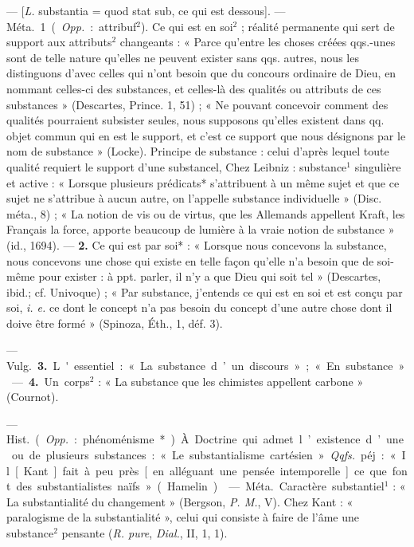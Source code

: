 \begin{itemize}[leftmargin=1cm, label=, itemsep=1pt]
 — [{\it L.} substantia = quod stat
sub, ce qui est dessous]. — \si{Méta.}
1. ({\it Opp.} : attribuf$^2$). Ce qui est en
soi$^2$ ; réalité permanente qui sert de
support aux attributs$^2$ changeants :
« Parce qu’entre les choses créées
qqs.-unes sont de telle nature qu’elles
ne peuvent exister sans qqs. autres,
nous les distinguons d’avec celles
qui n’ont besoin que du concours
ordinaire de Dieu, en nommant
celles-ci des substances, et celles-là
des qualités ou attributs de ces
substances » (Descartes, Prince.
1, 51) ; « Ne pouvant concevoir comment des qualités pourraient subsister seules, nous supposons qu’elles
existent dans qq. objet commun
qui en est le support, et c'est ce
support que nous désignons par le
nom de substance » (Locke). Principe
de substance : celui d'après lequel
toute qualité requiert le support
d'une substancel, Chez Leibniz :
substance$^1$ singulière et active :
« Lorsque plusieurs prédicats* s’attribuent à un même sujet et que ce
sujet ne s’attribue à aucun autre, on
l’appelle substance individuelle »
(Disc. méta., 8) ; « La notion de vis
ou de virtus, que les Allemands
appellent Kraft, les Français la
force, apporte beaucoup de lumière
à la vraie notion de substance »
(id., 1694). — {\bf 2.} Ce qui est par soi* :
« Lorsque nous concevons la substance, nous concevons une chose
qui existe en telle façon qu’elle n’a
besoin que de soi-même pour exister :
à ppt. parler, il n’y a que Dieu qui
soit tel » (Descartes, ibid.; cf. Univoque) ; « Par substance, j'entends ce
qui est en soi et est conçu par soi,
{\it i. e.} ce dont le concept n'a pas
besoin du concept d’une autre chose
dont il doive être formé » (Spinoza,
Éth., 1, déf. 3).

— \si{Vulg.} {\bf 3.} L'essentiel : « La
substance d’un discours » ; « En substance ». — {\bf 4.} Un corps$^2$ : « La substance que les chimistes appellent
carbone » (Cournot).

 — \si{Hist.} ({\it Opp.} : phénoménisme*). À. Doctrine qui admet
l’existence d’une ou de plusieurs
substances : « Le substantialisme
cartésien ». {\it Qqfs.} péj. : « Il [Kant]
fait à peu près [en alléguant une
pensée intemporelle] ce que font des
substantialistes naïfs » (Hamelin).

 — \si{Méta.} Caractère substantiel$^1$ : « La substantialité du
changement » (Bergson, {\it P. M.}, V).
Chez Kant : « paralogisme de la
substantialité », celui qui consiste à
faire de l'âme une substance$^2$ pensante ({\it R. pure}, {\it Dial.}, II, 1, 1).


\end{itemize}
